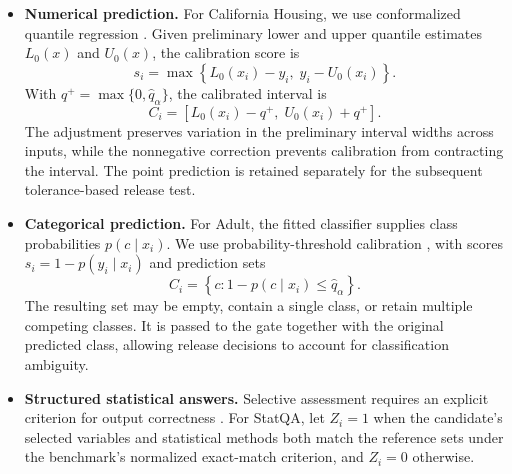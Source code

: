 \documentclass[preprint,12pt,authoryear]{elsarticle}
\begin{document}
\begin{itemize}

    \item \textbf{Numerical prediction.}
    For California Housing, we use conformalized quantile regression
    \citep{romano2019cqr}. Given preliminary lower and upper quantile
    estimates \(L_0(x)\) and \(U_0(x)\), the calibration score is
    \begin{equation}
        s_i
        =
        \max\left\{
            L_0(x_i)-y_i,\;
            y_i-U_0(x_i)
        \right\}.
        \label{eq:cqr_nonconformity}
    \end{equation}
    With \(q^{+}=\max\{0,\widehat q_\alpha\}\), the calibrated interval is
    \begin{equation}
        C_i
        =
        \left[
            L_0(x_i)-q^{+},\;
            U_0(x_i)+q^{+}
        \right].
        \label{eq:cqr_calibrated_interval}
    \end{equation}
    The adjustment preserves variation in the preliminary interval
    widths across inputs, while the nonnegative correction prevents
    calibration from contracting the interval. The point prediction
    is retained separately for the subsequent tolerance-based
    release test.

    \item \textbf{Categorical prediction.}
    For Adult, the fitted classifier supplies class probabilities
    \(p(c\mid x_i)\). We use probability-threshold calibration
    \citep{angelopoulos2023gentle}, with scores
    \(s_i=1-p(y_i\mid x_i)\) and prediction sets
    \begin{equation}
        C_i
        =
        \left\{
            c:
            1-p(c\mid x_i)\leq\widehat q_\alpha
        \right\}.
        \label{eq:categorical_prediction_set}
    \end{equation}
    The resulting set may be empty, contain a single class, or retain
    multiple competing classes. It is passed to the gate together
    with the original predicted class, allowing release decisions
    to account for classification ambiguity.

    \item \textbf{Structured statistical answers.}
    Selective assessment requires an explicit criterion for output
    correctness \citep{lee2024selective}. For StatQA, let \(Z_i=1\)
    when the candidate's selected variables and statistical methods
    both match the reference sets under the benchmark's normalized
    exact-match criterion, and \(Z_i=0\) otherwise.


\end{itemize}
\end{document}
